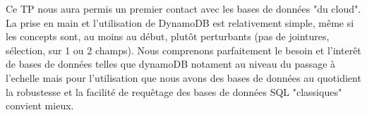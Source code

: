 Ce TP nous aura permis un premier contact avec les bases de données "du cloud". La prise en main et l'utilisation de DynamoDB est relativement simple, même si les concepts sont, au moins au début, plutôt perturbants (pas de jointures, sélection, sur 1 ou 2 champs). Nous comprenons parfaitement le besoin et l'interêt de bases de données telles que dynamoDB notament au niveau du passage à l'echelle mais pour l'utilisation que nous avons des bases de données au quotidient la robustesse et la facilité de requêtage des bases de données SQL "classiques" convient mieux.